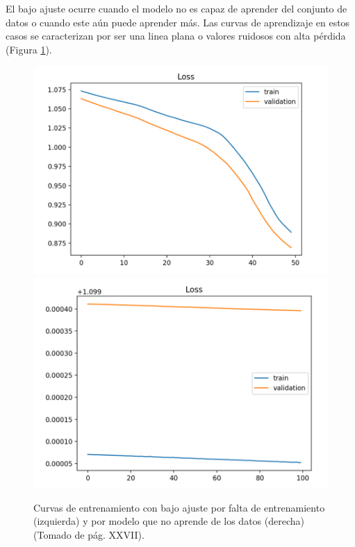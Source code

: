 El bajo ajuste ocurre cuando el modelo no es capaz de aprender del conjunto de datos o cuando este aún puede aprender 
más. Las curvas de aprendizaje en estos casos se caracterizan por ser una linea plana o valores ruidosos con alta pérdida
(Figura \ref{fig:underfit}).

\begin{figure}[h!]
	\begin{center}
		\includegraphics[scale=.2]{Graphics/underfit_missing_training.png}
		\includegraphics[scale=.2]{Graphics/underfit_not_learning.png}
		\caption{Curvas de entrenamiento con bajo ajuste por falta de entrenamiento (izquierda) 
		y por modelo que no aprende de los datos (derecha) (Tomado de \textcite{brownlee2018better} pág. XXVII).}\label{fig:underfit}
	\end{center}
\end{figure}

